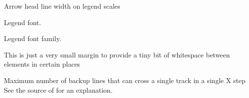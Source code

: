 \documentclass[letterpaper,10pt,english]{sphinxmanual}
\begin{document}
\begin{fulllineitems}
\begin{fulllineitems}
\end{fulllineitems}


\begin{fulllineitems}
\label{\detokenize{ref/util/plot/Plot:TotalDepth.util.plot.Plot.Plot.LEGEND_ARROW_WIDTH_PX}}
Arrow head line width on legend scales

\end{fulllineitems}


\begin{fulllineitems}
\label{\detokenize{ref/util/plot/Plot:TotalDepth.util.plot.Plot.Plot.CURVE_LEGEND_FONT_FAMILY}}
Legend font.

\end{fulllineitems}


\begin{fulllineitems}
\label{\detokenize{ref/util/plot/Plot:TotalDepth.util.plot.Plot.Plot.CURVE_LEGEND_FONT_SIZE}}
Legend font family.

\end{fulllineitems}


\begin{fulllineitems}
\label{\detokenize{ref/util/plot/Plot:TotalDepth.util.plot.Plot.Plot.MICRO_MARGIN}}
This is just a very small margin to provide a tiny bit of whitespace
between elements in certain places

\end{fulllineitems}


\begin{fulllineitems}
\label{\detokenize{ref/util/plot/Plot:TotalDepth.util.plot.Plot.Plot.MAX_BACKUP_TRACK_CROSSING_LINES}}
Maximum number of backup lines that can cross a single track in a single X step
See the source of  for an explanation.


\end{fulllineitems}
\end{fulllineitems}
\end{document}
